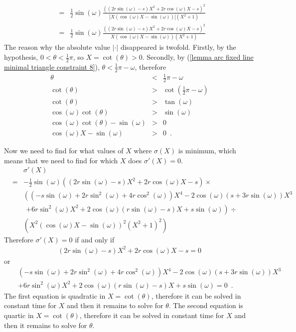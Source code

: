 \documentclass[11pt, oneside]{article}
\begin{document}
\begin{enumerate}
\begin{enumerate}
\begin{eqnarray*}
&=&\frac{1}{2}\sin(\omega)\frac{((2r\sin(\omega)-s)X^2+2r\cos(\omega)X-s)^2}{\left|X(\cos(\omega)X-\sin(\omega))\right|(X^2+1)}
\end{eqnarray*}
\begin{eqnarray*}
&=&\frac{1}{2}\sin(\omega)\frac{((2r\sin(\omega)-s)X^2+2r\cos(\omega)X-s)^2}{X(\cos(\omega)X-\sin(\omega))(X^2+1)}
\end{eqnarray*}
The reason why the absolute value $|\cdot|$ disappeared
is twofold.
Firstly,
by the hypothesis,
$0<\theta<\frac{1}{2}\pi$,
so $X=\cot(\theta)>0$.
Secondly,
by (\ref{lemma arc fixed line minimal triangle constraint 8}),
$\theta < \frac{1}{2}\pi-\omega$,
therefore
\begin{eqnarray*}
\theta &<& \frac{1}{2}\pi-\omega \\
\cot(\theta) &>& \cot\left(\frac{1}{2}\pi-\omega\right)\\
\cot(\theta) &>& \tan(\omega)\\
\cos(\omega)\cot(\theta) &>& \sin(\omega)\\
\cos(\omega)\cot(\theta) - \sin(\omega) &>& 0\\
\cos(\omega)X - \sin(\omega) &>& 0 \enspace.
\end{eqnarray*}

Now we need to find for what values
of $X$ where $\sigma(X)$ is minimum,
which means that we need to find for which $X$
does $\sigma'(X)=0$.
\begin{eqnarray*}
&&\sigma'(X)\\
&=&-\frac{1}{2}\sin(\omega)\left((2r\sin(\omega)-s)X^2+2r\cos(\omega)X-s\right)\times\\
&&\left((-s\sin(\omega)+2r\sin^2\!(\omega)+4r\cos^2\!(\omega))X^4-2\cos(\omega)(s+3r\sin(\omega))X^3 \right.\\
&&\phantom{(}\left. +6r\sin^2\!(\omega)X^2+2\cos(\omega)(r\sin(\omega)-s)X+s\sin(\omega)\right)\div\\
&&\left(X^2(\cos(\omega)X-\sin(\omega))^2(X^2+1)^2\right)
\end{eqnarray*}
Therefore $\sigma'(X)=0$ if and only if
\begin{eqnarray}
\label{lemma arc fixed line minimal triangle equation 3}
(2r\sin(\omega)-s)X^2+2r\cos(\omega)X-s=0
\end{eqnarray}
or
\begin{eqnarray}
\nonumber
&&(-s\sin(\omega)+2r\sin^2\!(\omega)+4r\cos^2\!(\omega))X^4-2\cos(\omega)(s+3r\sin(\omega))X^3 \\
\label{lemma arc fixed line minimal triangle equation 4}
&&+6r\sin^2\!(\omega)X^2+2\cos(\omega)(r\sin(\omega)-s)X+s\sin(\omega)=0 \enspace.
\end{eqnarray}
The first equation is quadratic in $X=\cot(\theta)$,
therefore it can be solved in constant time for $X$
and then it remains to solve for $\theta$.
The second equation is quartic in $X=\cot(\theta)$,
therefore it can be solved
in constant time for $X$
and then it remains to solve for $\theta$.


\end{enumerate}
\end{enumerate}
\end{document}
